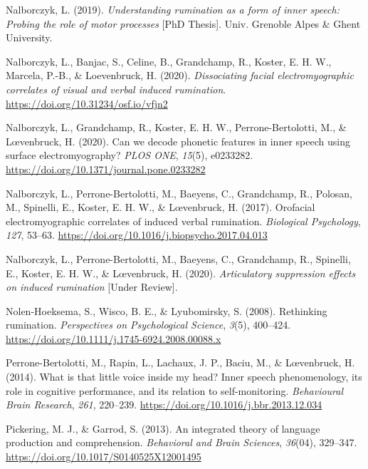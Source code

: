 \documentclass[
  english,
  man, donotrepeattitle,floatsintext]{apa6}
\newlength{\cslhangindent}
\newenvironment{cslreferences}%
  {\setlength{\parindent}{0pt}%
  \everypar{\setlength{\hangindent}{\cslhangindent}}\ignorespaces}%
  {\par}
\begin{document}
\begin{cslreferences}
\leavevmode\hypertarget{ref-nalborczyk_understanding_2019}{}%
Nalborczyk, L. (2019). \emph{Understanding rumination as a form of inner speech: Probing the role of motor processes} {[}PhD Thesis{]}. Univ. Grenoble Alpes \& Ghent University.

\leavevmode\hypertarget{ref-nalborczyk_dissociating_2020}{}%
Nalborczyk, L., Banjac, S., Celine, B., Grandchamp, R., Koster, E. H. W., Marcela, P.-B., \& Loevenbruck, H. (2020). \emph{Dissociating facial electromyographic correlates of visual and verbal induced rumination}. \url{https://doi.org/10.31234/osf.io/vfjn2}

\leavevmode\hypertarget{ref-nalborczyk_can_2020}{}%
Nalborczyk, L., Grandchamp, R., Koster, E. H. W., Perrone-Bertolotti, M., \& Lœvenbruck, H. (2020). Can we decode phonetic features in inner speech using surface electromyography? \emph{PLOS ONE}, \emph{15}(5), e0233282. \url{https://doi.org/10.1371/journal.pone.0233282}

\leavevmode\hypertarget{ref-nalborczyk_orofacial_2017}{}%
Nalborczyk, L., Perrone-Bertolotti, M., Baeyens, C., Grandchamp, R., Polosan, M., Spinelli, E., Koster, E. H. W., \& Lœvenbruck, H. (2017). Orofacial electromyographic correlates of induced verbal rumination. \emph{Biological Psychology}, \emph{127}, 53--63. \url{https://doi.org/10.1016/j.biopsycho.2017.04.013}

\leavevmode\hypertarget{ref-nalborczyk_articulatory_2020}{}%
Nalborczyk, L., Perrone-Bertolotti, M., Baeyens, C., Grandchamp, R., Spinelli, E., Koster, E. H. W., \& Lœvenbruck, H. (2020). \emph{Articulatory suppression effects on induced rumination} {[}Under Review{]}.

\leavevmode\hypertarget{ref-Nolen-Hoeksema2008}{}%
Nolen-Hoeksema, S., Wisco, B. E., \& Lyubomirsky, S. (2008). Rethinking rumination. \emph{Perspectives on Psychological Science}, \emph{3}(5), 400--424. \url{https://doi.org/10.1111/j.1745-6924.2008.00088.x}

\leavevmode\hypertarget{ref-perrone-bertolotti_what_2014}{}%
Perrone-Bertolotti, M., Rapin, L., Lachaux, J. P., Baciu, M., \& Lœvenbruck, H. (2014). What is that little voice inside my head? Inner speech phenomenology, its role in cognitive performance, and its relation to self-monitoring. \emph{Behavioural Brain Research}, \emph{261}, 220--239. \url{https://doi.org/10.1016/j.bbr.2013.12.034}

\leavevmode\hypertarget{ref-pickering_integrated_2013}{}%
Pickering, M. J., \& Garrod, S. (2013). An integrated theory of language production and comprehension. \emph{Behavioral and Brain Sciences}, \emph{36}(04), 329--347. \url{https://doi.org/10.1017/S0140525X12001495}


\end{cslreferences}
\end{document}
